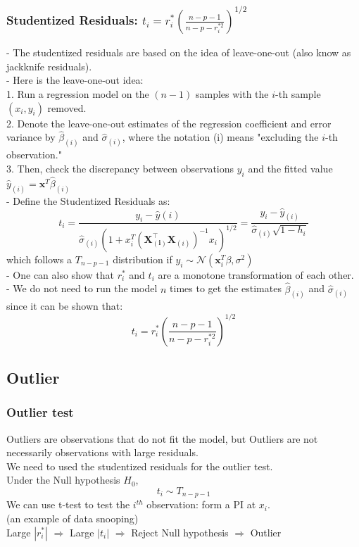 \documentclass[11pt,a4paper]{article}
\begin{document}
\subsubsection{Studentized Residuals: $
t_{i}=r_{i}^{*}\left(\frac{n-p-1}{n-p-r_{i}^{* 2}}\right)^{1 / 2}
$}
- The studentized residuals are based on the idea of leave-one-out (also know as jackknife residuals).\\
- Here is the leave-one-out idea:\\
1. Run a regression model on the $(n-1)$ samples with the $i$-th sample $\left(x_{i}, y_{i}\right)$ removed.\\
2. Denote the leave-one-out estimates of the regression coefficient and error variance by $\hat{\beta}_{(i)}$ and $\hat{\sigma}_{(i)}$, where the notation (i) means "excluding the $i$-th observation."\\
3. Then, check the discrepancy between observations $y_{i}$ and the fitted value $\hat{y}_{(i)}=\mathbf{x}^{T} \hat{\beta}_{(i)}$\\
- Define the Studentized Residuals as:
$$
t_{i}=\frac{y_{i}-\hat{y}(i)}{\hat{\sigma}_{(i)}\left(1+x_{i}^{T}\left(\mathbf{X}_{(\mathbf{i})}^{\top} \mathbf{X}_{(i)}\right)^{-1} x_{i}\right)^{1 / 2}}=\frac{y_{i}-\hat{y}_{(i)}}{\hat{\sigma}_{(i)} \sqrt{1-h_{i}}}
$$
which follows a $T_{n-p-1}$ distribution if $y_{i} \sim \mathcal{N}\left(\mathbf{x}_{i}^{T} \beta, \sigma^{2}\right)$\\
- One can also show that $r_{i}^{*}$ and $t_{i}$ are a monotone transformation of each other.\\
- We do not need to run the model $n$ times to get the estimates $\hat{\beta}_{(i)}$ and $\hat{\sigma}_{(i)}$ since it can be shown that:
$$
t_{i}=r_{i}^{*}\left(\frac{n-p-1}{n-p-r_{i}^{* 2}}\right)^{1 / 2}
$$

\subsection{Outlier}
\subsubsection{Outlier test}
Outliers are observations that do not ﬁt the model, but Outliers are not necessarily observations with large residuals.\\
We need to used the studentized residuals for the outlier test.\\
Under the Null hypothesis $H_0$,
$$t_i\sim T_{n-p-1}$$
We can use t-test to test the $i^{th}$ observation: form a PI at $x_i$.\\
(an example of data snooping)\\
Large $|r_i^*|$ $\Rightarrow$ Large $|t_i|$ $\Rightarrow$ Reject Null hypothesis $\Rightarrow$ Outlier
\end{document}
